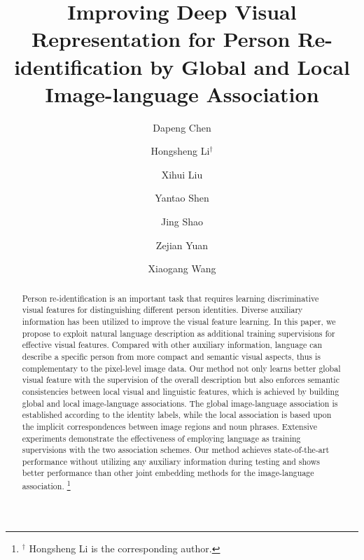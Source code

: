\documentclass[runningheads]{llncs}
\newcommand\blfootnote[1]{\begingroup
  \renewcommand\thefootnote{}\footnote{#1}\addtocounter{footnote}{-1}\endgroup
}
\begin{document}
\title{Improving Deep Visual Representation for Person Re-identification by Global and Local Image-language Association} 


\author{Dapeng Chen \and
Hongsheng Li$^{\dagger}$  \and Xihui Liu  \and Yantao Shen \and Jing Shao  
\and Zejian Yuan \and Xiaogang Wang}


\maketitle              \begin{abstract}
Person re-identification is an important task that requires learning discriminative visual features for distinguishing different person identities. Diverse auxiliary information has been utilized to improve the visual feature learning. In this paper, we propose to exploit natural language description as additional training supervisions for effective visual features. Compared with other auxiliary information, language can describe a specific person from more compact and semantic visual aspects, thus is complementary to the pixel-level image data. Our method not only learns better global visual feature with the supervision of the overall description but also enforces semantic consistencies between local visual and linguistic features, which is achieved by building global and local image-language associations. The global image-language association is established
according to the identity labels, while the local association is based upon the implicit correspondences between image regions and noun phrases. Extensive experiments demonstrate the effectiveness of employing language as training supervisions with the two association schemes. Our method achieves state-of-the-art performance without utilizing any auxiliary information during testing and shows better performance than other joint embedding methods for the image-language association. \blfootnote{$^{\dagger}$ Hongsheng Li is the corresponding author.}
\end{abstract}
\end{document}
